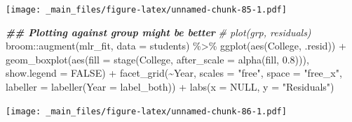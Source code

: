 \documentclass[
]{book}
\newenvironment{Shaded}{\begin{snugshade}}{\end{snugshade}}
\newcommand{\AttributeTok}[1]{\textcolor[rgb]{0.77,0.63,0.00}{#1}}
\newcommand{\CommentTok}[1]{\textcolor[rgb]{0.56,0.35,0.01}{\textit{#1}}}
\newcommand{\ConstantTok}[1]{\textcolor[rgb]{0.00,0.00,0.00}{#1}}
\newcommand{\DocumentationTok}[1]{\textcolor[rgb]{0.56,0.35,0.01}{\textbf{\textit{#1}}}}
\newcommand{\FloatTok}[1]{\textcolor[rgb]{0.00,0.00,0.81}{#1}}
\newcommand{\FunctionTok}[1]{\textcolor[rgb]{0.00,0.00,0.00}{#1}}
\newcommand{\NormalTok}[1]{#1}
\newcommand{\SpecialCharTok}[1]{\textcolor[rgb]{0.00,0.00,0.00}{#1}}
\newcommand{\StringTok}[1]{\textcolor[rgb]{0.31,0.60,0.02}{#1}}
\begin{document}
\texttt{[image: \_main\_files/figure-latex/unnamed-chunk-85-1.pdf]}

\begin{Shaded}
\begin{Highlighting}[]
\DocumentationTok{\#\# Plotting against group might be better}
\CommentTok{\# plot(grp, residuals)}
\NormalTok{broom}\SpecialCharTok{::}\FunctionTok{augment}\NormalTok{(mlr\_fit, }\AttributeTok{data =}\NormalTok{ students) }\SpecialCharTok{\%\textgreater{}\%} 
  \FunctionTok{ggplot}\NormalTok{(}\FunctionTok{aes}\NormalTok{(College, .resid)) }\SpecialCharTok{+}
  \FunctionTok{geom\_boxplot}\NormalTok{(}\FunctionTok{aes}\NormalTok{(}\AttributeTok{fill =} \FunctionTok{stage}\NormalTok{(College, }\AttributeTok{after\_scale =} \FunctionTok{alpha}\NormalTok{(fill, }\FloatTok{0.8}\NormalTok{))), }\AttributeTok{show.legend =} \ConstantTok{FALSE}\NormalTok{) }\SpecialCharTok{+}
  \FunctionTok{facet\_grid}\NormalTok{(}\SpecialCharTok{\textasciitilde{}}\NormalTok{Year, }\AttributeTok{scales =} \StringTok{"free"}\NormalTok{, }\AttributeTok{space =} \StringTok{"free\_x"}\NormalTok{, }\AttributeTok{labeller =} \FunctionTok{labeller}\NormalTok{(}\AttributeTok{Year =}\NormalTok{ label\_both)) }\SpecialCharTok{+}
  \FunctionTok{labs}\NormalTok{(}\AttributeTok{x =} \ConstantTok{NULL}\NormalTok{, }\AttributeTok{y =} \StringTok{"Residuals"}\NormalTok{)}
\end{Highlighting}
\end{Shaded}

\texttt{[image: \_main\_files/figure-latex/unnamed-chunk-86-1.pdf]}
\end{document}
